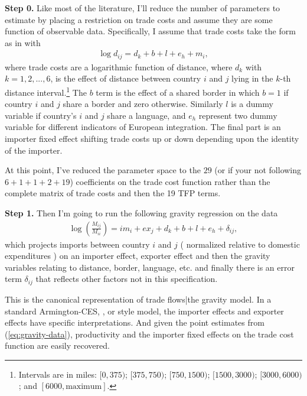 \documentclass[12pt,pdftex]{article}
\begin{document}
\begin{onehalfspacing}
\textbf{Step 0.} Like most of the literature, I'll reduce the number of parameters to estimate by placing a restriction on trade costs and assume they are some function of observable data. Specifically, I assume that trade costs take the form as in \citet{eaton2002technology} with
\begin{align}
\log d_{ij} = d_{k} + b + l + e_{h} + m_{i},
\label{eq:trade-cost-function}
\end{align}
where trade costs are a logarithmic function of distance, where $d_k$ with $k = 1,2,...,6$, is the effect of distance between country $i$ and $j$ lying in the $k$-th distance interval.\footnote{Intervals are in miles: $[0,375)$; $[375,750)$; $[750,1500)$; $[1500,3000)$; $[3000,6000)$; and $[6000,\mbox{maximum}]$. } The $b$ term is the effect of a shared border in which $b =1$ if country $i$ and $j$ share a border and zero otherwise. Similarly $l$ is a dummy variable if country's $i$ and $j$ share a language, and $e_{h}$ represent two dummy variable for different indicators of European integration. The final part is an importer fixed effect shifting trade costs up or down depending upon the identity of the importer.

At this point, I've reduced the parameter space to the $29$ (or if your not following $6 + 1 + 1 + 2 + 19$) coefficients on the trade cost function rather than the complete matrix of trade costs and then the 19 TFP terms.

\textbf{Step 1.} Then I'm going to run the following gravity regression on the data
\begin{align}
\log \left( {\frac{M_{ij}}{M_{ii}}} \right) = {im_{i}} + {ex_{j}} + {d_{k}} + {b} + {l} + {e_{h}} + \delta_{ij},
\label{eq:gravity-data}
\end{align}
which projects imports between country $i$ and $j$ ( normalized relative to domestic expenditures ) on an importer effect, exporter effect and then the gravity variables relating to distance, border, language, etc. and finally there is an error term $\delta_{ij}$ that reflects other factors not in this specification.

This is the canonical representation of trade flows|the gravity model. In a standard Armington-CES, \citet{eaton2002technology}, or \citet{melitz2003impact} style model, the importer effects and exporter effects have specific interpretations. And given the point estimates from (\ref{eq:gravity-data}), productivity and the importer fixed effects on the trade cost function are easily recovered.


\end{onehalfspacing}
\end{document}
